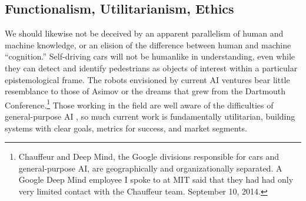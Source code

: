 \subsection{Functionalism, Utilitarianism, Ethics} 


We should likewise not be deceived by an apparent parallelism of human
and machine knowledge, or an elision of the difference between human
and machine ``cognition.'' Self-driving cars will not be humanlike in
understanding, even while they can detect and identify pedestrians as
objects of interest within a particular epistemological frame. The
robots envisioned by current AI 
ventures bear little resemblance to those of Asimov or the dreams that grew
from the Dartmouth Conference.\footnote{Chauffeur and Deep Mind, the
  Google divisions responsible for cars and general-purpose AI, are
geographically and organizationally separated. A Google Deep Mind
employee I spoke to at MIT said that they had had only very limited
contact with the Chauffeur team. September 10, 2014.}  Those working
in the field are well aware of 
the difficulties of general-purpose AI \cite{sofgeAIFears}, so much
current work is 
fundamentally utilitarian, building systems with clear goals, metrics
for success, and market segments.


